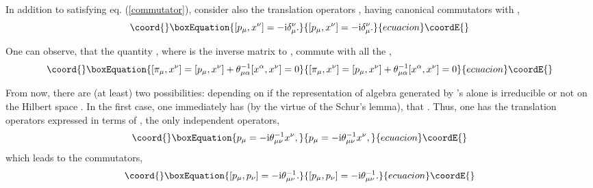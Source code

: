 \documentclass[a4paper]{amsart}
\providecommand{\ii}{\mathrm{i}}
\providecommand{\hh}{\mathcal{H}}
\begin{document}
In addition to \coordHE{} satisfying eq. (\ref{commutator}), consider
also the translation operators \coordHE{}, having canonical
commutators with \coordHE{},
\begin{equation}\coord{}\boxEquation{\label{pmu}
  [p_\mu,x^\nu]=-\ii \delta_\mu^\nu.
}{[p_\mu,x^\nu]=-\ii \delta_\mu^\nu.
}{ecuacion}\coordE{}\end{equation}

One can observe, that the quantity
\coordHE{}, where
\coordHE{} is the inverse matrix to \myHighlight{$\theta_{\mu\nu}$}\coordHE{},
commute with all the \coordHE{},
\begin{equation}\coord{}\boxEquation{\label{zero}
  [\pi_\mu,x^\nu]=[p_\mu,x^\nu]+\theta^{-1}_{\mu\alpha}
  [x^\alpha,x^\nu]=0
}{[\pi_\mu,x^\nu]=[p_\mu,x^\nu]+\theta^{-1}_{\mu\alpha}
  [x^\alpha,x^\nu]=0
}{ecuacion}\coordE{}\end{equation}


From now, there are (at least) two possibilities: depending on if
the representation of algebra generated by \coordHE{}'s alone is
irreducible or not on the Hilbert space \myHighlight{$\hh$}\coordHE{}. In the first case,
one immediately has (by the virtue of the Schur's lemma), that
\coordHE{}. Thus, one has the translation operators \coordHE{}
expressed in terms of \coordHE{}, the only independent operators,
\begin{equation}\coord{}\boxEquation{\label{irrep}
  p_\mu=-\ii \theta^{-1}_{\mu\nu}x^\nu,
}{p_\mu=-\ii \theta^{-1}_{\mu\nu}x^\nu,
}{ecuacion}\coordE{}\end{equation}
which leads to the commutators,
\begin{equation}\coord{}\boxEquation{\label{[pp]}
  [p_\mu,p_\nu]=-\ii \theta^{-1}_{\mu\nu}.
}{[p_\mu,p_\nu]=-\ii \theta^{-1}_{\mu\nu}.
}{ecuacion}\coordE{}\end{equation}
\end{document}

